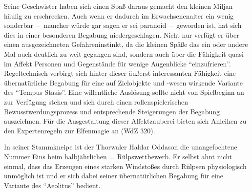 Seine Geschwister haben sich einen Spaß daraus gemacht den kleinen Miljan häufig zu erschrecken. Auch wenn er dadurch im Erwachsenenalter ein wenig sonderbar~--~mancher würde gar sagen er sei paranoid~--~geworden ist, hat sich dies in einer besonderen Begabung niedergeschlagen. Nicht nur verfügt er über einen ausgezeichneten Gefahreninstinkt, da die kleinen Späße das ein oder andere Mal auch deutlich zu weit gegangen sind, sondern auch über die Fähigkeit quasi im Affekt Personen und Gegenstände für wenige Augenblicke \enquote{einzufrieren}. Regeltechnisch verbirgt sich hinter dieser äußerst interessanten Fähigkeit eine übernatürliche Begabung für eine auf Zielobjekte und -wesen wirkende Variante des \enquote{Tempus Stasis}. Eine willentliche Auslösung sollte nicht von Spielbeginn an zur Verfügung stehen und sich durch einen rollenspielerischen Bewusstwerdungsprozess und entsprechende Steigerungen der Begabung auszeichnen. Für die Ausgestaltung dieser Affektzauberei bieten sich Anleihen zu den Expertenregeln zur Elfenmagie an (WdZ 320).

In seiner Stammkneipe ist der Thorwaler Haldar Oddason die unangefochtene Nummer Eins beim halbjährlichen ... Rülpswettbewerb. Er selbst ahnt nicht einmal, dass das Erzeugen eines starken Windstoßes durch Rülpsen physiologisch unmöglich ist und er sich dabei seiner übernatürlichen Begabung für eine Variante des \enquote{Aeolitus} bedient.

